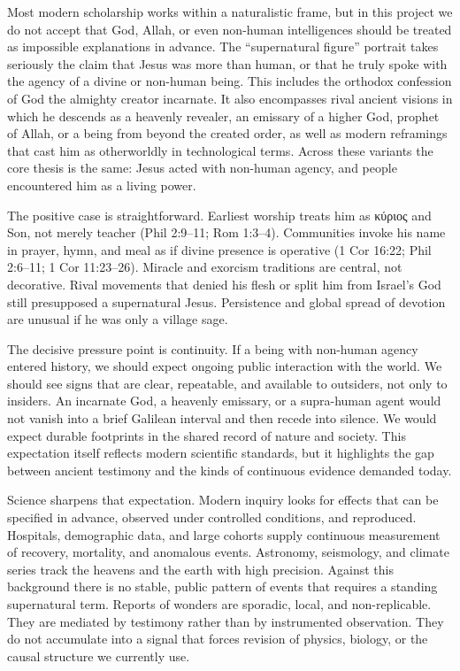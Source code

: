 Most modern scholarship works within a naturalistic frame, but in this project we do not accept that God, Allah, or even non-human intelligences should be treated as impossible explanations in advance.
The ``supernatural figure'' portrait takes seriously the claim that Jesus was more than human, or that he truly spoke with the agency of a divine or non-human being.
This includes the orthodox confession of God the almighty creator incarnate.
It also encompasses rival ancient visions in which he descends as a heavenly revealer, an emissary of a higher God, prophet of Allah, or a being from beyond the created order, as well as modern reframings that cast him as otherworldly in technological terms.
Across these variants the core thesis is the same: Jesus acted with non-human agency, and people encountered him as a living power.

The positive case is straightforward.
Earliest worship treats him as κύριος and Son, not merely teacher (Phil 2:9--11; Rom 1:3--4).
Communities invoke his name in prayer, hymn, and meal as if divine presence is operative (1 Cor 16:22; Phil 2:6--11; 1 Cor 11:23--26).
Miracle and exorcism traditions are central, not decorative.
Rival movements that denied his flesh or split him from Israel’s God still presupposed a supernatural Jesus.
Persistence and global spread of devotion are unusual if he was only a village sage.

The decisive pressure point is continuity.
If a being with non-human agency entered history, we should expect ongoing public interaction with the world.
We should see signs that are clear, repeatable, and available to outsiders, not only to insiders.
An incarnate God, a heavenly emissary, or a supra-human agent would not vanish into a brief Galilean interval and then recede into silence.
We would expect durable footprints in the shared record of nature and society.
This expectation itself reflects modern scientific standards, but it highlights the gap between ancient testimony and the kinds of continuous evidence demanded today.

Science sharpens that expectation.
Modern inquiry looks for effects that can be specified in advance, observed under controlled conditions, and reproduced.
Hospitals, demographic data, and large cohorts supply continuous measurement of recovery, mortality, and anomalous events.
Astronomy, seismology, and climate series track the heavens and the earth with high precision.
Against this background there is no stable, public pattern of events that requires a standing supernatural term.
Reports of wonders are sporadic, local, and non-replicable.
They are mediated by testimony rather than by instrumented observation.
They do not accumulate into a signal that forces revision of physics, biology, or the causal structure we currently use.

